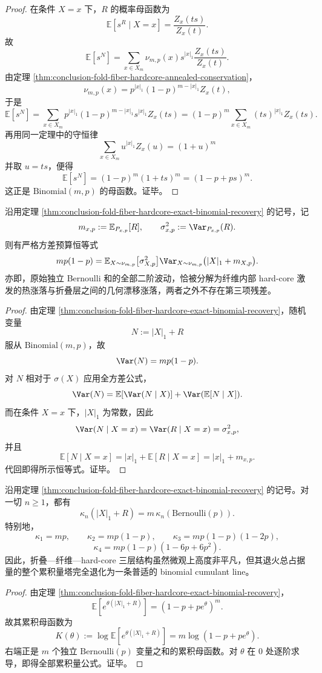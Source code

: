 \begin{proof}
在条件 \(X=x\) 下，\(R\) 的概率母函数为
\[
\mathbb E[s^R\mid X=x]=\frac{Z_x(ts)}{Z_x(t)}.
\]
故
\[
\mathbb E[s^N]
=\sum_{x\in X_m}\nu_{m,p}(x)s^{|x|_1}\frac{Z_x(ts)}{Z_x(t)}.
\]
由定理 \ref{thm:conclusion-fold-fiber-hardcore-annealed-conservation}，
\[
\nu_{m,p}(x)=p^{|x|_1}(1-p)^{m-|x|_1}Z_x(t),
\]
于是
\[
\mathbb E[s^N]
=
\sum_{x\in X_m}p^{|x|_1}(1-p)^{m-|x|_1}s^{|x|_1}Z_x(ts)
=(1-p)^m\sum_{x\in X_m}(ts)^{|x|_1}Z_x(ts).
\]
再用同一定理中的守恒律
\[
\sum_{x\in X_m}u^{|x|_1}Z_x(u)=(1+u)^m
\]
并取 \(u=ts\)，便得
\[
\mathbb E[s^N]=(1-p)^m(1+ts)^m=(1-p+ps)^m.
\]
这正是 \(\mathrm{Binomial}(m,p)\) 的母函数。证毕。
\end{proof}

\begin{theorem}\label{thm:conclusion-fold-fiber-hardcore-variance-budget-splitting}
沿用定理 \ref{thm:conclusion-fold-fiber-hardcore-exact-binomial-recovery} 的记号，记
\[
m_{x,p}:=\mathbb E_{P_{x,p}}[R],
\qquad
\sigma^2_{x,p}:=\Var_{P_{x,p}}(R).
\]
则有严格方差预算恒等式
\[
mp(1-p)
=
\mathbb E_{X\sim \nu_{m,p}}\bigl[\sigma^2_{X,p}\bigr]
\Var_{X\sim \nu_{m,p}}\bigl(|X|_1+m_{X,p}\bigr).
\]
亦即，原始独立 Bernoulli 和的全部二阶波动，恰被分解为纤维内部 hard-core 激发的热涨落与折叠层之间的几何漂移涨落，两者之外不存在第三项残差。
\end{theorem}

\begin{proof}
由定理 \ref{thm:conclusion-fold-fiber-hardcore-exact-binomial-recovery}，随机变量
\[
N:=|X|_1+R
\]
服从 \(\mathrm{Binomial}(m,p)\)，故
\[
\Var(N)=mp(1-p).
\]
对 \(N\) 相对于 \(\sigma(X)\) 应用全方差公式，
\[
\Var(N)=\mathbb E[\Var(N\mid X)]+\Var(\mathbb E[N\mid X]).
\]
而在条件 \(X=x\) 下，\(|X|_1\) 为常数，因此
\[
\Var(N\mid X=x)=\Var(R\mid X=x)=\sigma^2_{x,p},
\]
并且
\[
\mathbb E[N\mid X=x]=|x|_1+\mathbb E[R\mid X=x]=|x|_1+m_{x,p}.
\]
代回即得所示恒等式。证毕。
\end{proof}

\begin{theorem}[全阶累积量的普适传输]\label{thm:conclusion-fold-fiber-hardcore-universal-cumulant-transport}
沿用定理 \ref{thm:conclusion-fold-fiber-hardcore-exact-binomial-recovery} 的记号。对一切 \(n\ge 1\)，都有
\[
\kappa_n(|X|_1+R)=m\,\kappa_n(\mathrm{Bernoulli}(p)).
\]
特别地，
\[
\kappa_1=mp,\qquad
\kappa_2=mp(1-p),\qquad
\kappa_3=mp(1-p)(1-2p),
\]
\[
\kappa_4=mp(1-p)(1-6p+6p^2).
\]
因此，折叠—纤维—hard-core 三层结构虽然微观上高度非平凡，但其退火总占据量的整个累积量塔完全退化为一条普适的 binomial cumulant line。
\end{theorem}

\begin{proof}
由定理 \ref{thm:conclusion-fold-fiber-hardcore-exact-binomial-recovery}，
\[
\mathbb E[e^{\theta(|X|_1+R)}]=(1-p+pe^\theta)^m.
\]
故其累积母函数为
\[
K(\theta):=\log\mathbb E[e^{\theta(|X|_1+R)}]
=m\log(1-p+pe^\theta).
\]
右端正是 \(m\) 个独立 \(\mathrm{Bernoulli}(p)\) 变量之和的累积母函数。对 \(\theta\) 在 \(0\) 处逐阶求导，即得全部累积量公式。证毕。
\end{proof}
